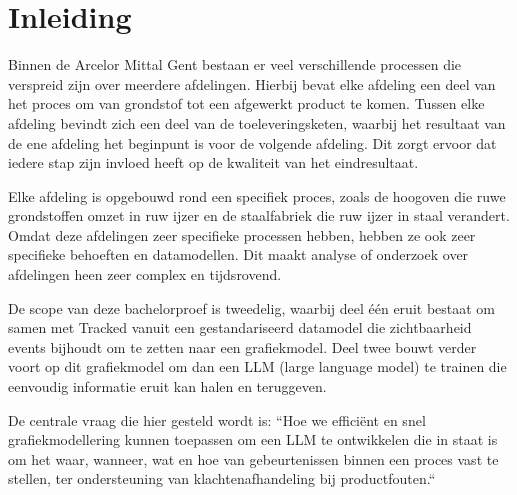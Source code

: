 


% 

\section{Inleiding}%
\label{sec:inleiding}
Binnen de Arcelor Mittal Gent bestaan er veel verschillende processen die verspreid zijn over meerdere afdelingen.
Hierbij bevat elke afdeling een deel van het proces om van grondstof tot een afgewerkt product te komen. 
Tussen elke afdeling bevindt zich een deel van de toeleveringsketen, waarbij het resultaat van de ene afdeling het beginpunt is voor de volgende afdeling.
Dit zorgt ervoor dat iedere stap zijn invloed heeft op de kwaliteit van het eindresultaat.

Elke afdeling is opgebouwd rond een specifiek proces, zoals de hoogoven die ruwe grondstoffen omzet in ruw ijzer en de staalfabriek die ruw ijzer in staal verandert.
Omdat deze afdelingen zeer specifieke processen hebben, hebben ze ook zeer specifieke behoeften en datamodellen.
Dit maakt analyse of onderzoek over afdelingen heen zeer complex en tijdsrovend.

De scope van deze bachelorproef is tweedelig, waarbij deel één eruit bestaat om samen met Tracked vanuit een gestandariseerd datamodel die zichtbaarheid events bijhoudt om te zetten naar een grafiekmodel.
Deel twee bouwt verder voort op dit grafiekmodel om dan een LLM (large language model) te trainen die eenvoudig informatie eruit kan halen en teruggeven.

De centrale vraag die hier gesteld wordt is: ``Hoe we efficiënt en snel grafiekmodellering kunnen toepassen om een LLM te ontwikkelen die in staat is om het waar, wanneer, wat en hoe van gebeurtenissen binnen een proces vast te stellen, ter ondersteuning van klachtenafhandeling bij productfouten.``

